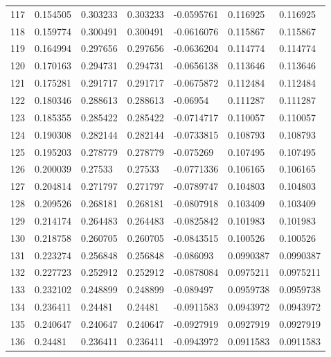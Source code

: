 \begin{longtable}{l|lll|lll}
 117 &  0.154505    & 0.303233    & 0.303233    & -0.0595761   & 0.116925    & 0.116925    \\
 118 &  0.159774    & 0.300491    & 0.300491    & -0.0616076   & 0.115867    & 0.115867    \\
 119 &  0.164994    & 0.297656    & 0.297656    & -0.0636204   & 0.114774    & 0.114774    \\
 120 &  0.170163    & 0.294731    & 0.294731    & -0.0656138   & 0.113646    & 0.113646    \\
 121 &  0.175281    & 0.291717    & 0.291717    & -0.0675872   & 0.112484    & 0.112484    \\
 122 &  0.180346    & 0.288613    & 0.288613    & -0.06954     & 0.111287    & 0.111287    \\
 123 &  0.185355    & 0.285422    & 0.285422    & -0.0714717   & 0.110057    & 0.110057    \\
 124 &  0.190308    & 0.282144    & 0.282144    & -0.0733815   & 0.108793    & 0.108793    \\
 125 &  0.195203    & 0.278779    & 0.278779    & -0.075269    & 0.107495    & 0.107495    \\
 126 &  0.200039    & 0.27533     & 0.27533     & -0.0771336   & 0.106165    & 0.106165    \\
 127 &  0.204814    & 0.271797    & 0.271797    & -0.0789747   & 0.104803    & 0.104803    \\
 128 &  0.209526    & 0.268181    & 0.268181    & -0.0807918   & 0.103409    & 0.103409    \\
 129 &  0.214174    & 0.264483    & 0.264483    & -0.0825842   & 0.101983    & 0.101983    \\
 130 &  0.218758    & 0.260705    & 0.260705    & -0.0843515   & 0.100526    & 0.100526    \\
 131 &  0.223274    & 0.256848    & 0.256848    & -0.086093    & 0.0990387   & 0.0990387   \\
 132 &  0.227723    & 0.252912    & 0.252912    & -0.0878084   & 0.0975211   & 0.0975211   \\
 133 &  0.232102    & 0.248899    & 0.248899    & -0.089497    & 0.0959738   & 0.0959738   \\
 134 &  0.236411    & 0.24481     & 0.24481     & -0.0911583   & 0.0943972   & 0.0943972   \\
 135 &  0.240647    & 0.240647    & 0.240647    & -0.0927919   & 0.0927919   & 0.0927919   \\
 136 &  0.24481     & 0.236411    & 0.236411    & -0.0943972   & 0.0911583   & 0.0911583   \\

\end{longtable}
